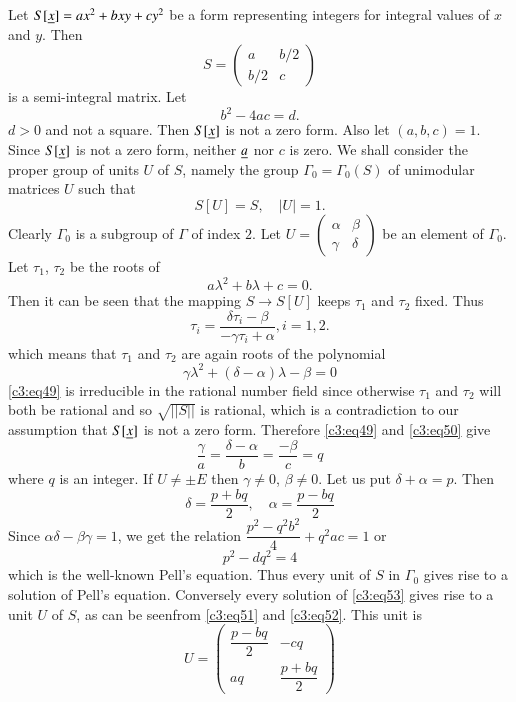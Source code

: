 Let $S[\underline{x}]=ax^{2}+bxy+cy^{2}$ be a form representing integers for
integral values of $x$ and $y$. Then
$$
S=
\begin{pmatrix}
a & b/2\\
b/2 & c
\end{pmatrix}
$$
is a semi-integral matrix. Let
$$
b^{2}-4ac=d.
$$
$d>0$ and not a square. Then $S[\underline{x}]$ is not a zero form. Also let
$(a,b,c)=1$. Since $S[\underline{x}]$ is not a zero form, neither $\underline{a}$
nor $c$ is zero. We shall consider the proper group of units $U$ of
$S$, namely the group $\Gamma_{0}=\Gamma_{0}(S)$ of unimodular
matrices $U$ such that
\begin{equation*}
S[U]=S,\quad |U|=1.\tag{48}\label{c3:eq48}
\end{equation*}
Clearly $\Gamma_{0}$ is a subgroup of $\Gamma$ of index $2$. Let
$U=\left(\begin{smallmatrix} \alpha & \beta\\ \gamma & \delta
\end{smallmatrix}\right)$ be an element of $\Gamma_{0}$. Let
$\tau_{1}$, $\tau_{2}$ be the roots of 
\begin{equation*}
a\lambda^{2}+b\lambda+c=0.\tag{49}\label{c3:eq49}
\end{equation*}\pageoriginale
Then it can be seen that the mapping $S\to S[U]$ keeps $\tau_{1}$ and
$\tau_{2}$ fixed. Thus
$$
\tau_{i}=\frac{\delta\tau_{i}-\beta}{-\gamma\tau_{i}+\alpha},i=1,2.
$$
which means that $\tau_{1}$ and $\tau_{2}$ are again roots of the
polynomial
\begin{equation*}
\gamma\lambda^{2}+(\delta-\alpha)\lambda-\beta=0\tag{50}\label{c3:eq50}
\end{equation*}
\eqref{c3:eq49} is irreducible in the rational number field since otherwise
$\tau_{1}$ and $\tau_{2}$ will both be rational and so $\sqrt{||S||}$
is rational, which is a contradiction to our assumption that
$S[\underline{x}]$ is not a zero form. Therefore \eqref{c3:eq49} and \eqref{c3:eq50}
give
\begin{equation*}
\frac{\gamma}{a}=\frac{\delta-\alpha}{b}=\frac{-\beta}{c}=q\tag{51}\label{c3:eq51}
\end{equation*}
where $q$ is an integer. If $U\neq \pm E$ then $\gamma\neq 0$,
$\beta\neq 0$. Let us put $\delta+\alpha=p$. Then
\begin{equation*}
\delta=\frac{p+bq}{2},\quad \alpha=\frac{p-bq}{2}\tag{52}\label{c3:eq52}
\end{equation*}
Since $\alpha\delta-\beta\gamma=1$, we get the relation
$\dfrac{p^{2}-q^{2}b^{2}}{4}+q^{2}ac=1$ or
\begin{equation*}
\boxed{p^{2}-dq^{2}=4}\tag{53}\label{c3:eq53}
\end{equation*}
which is the well-known Pell's equation. Thus every unit of $S$ in
$\Gamma_{0}$ gives rise to a solution of Pell's equation. Conversely
every solution of \eqref{c3:eq53} gives rise to a unit $U$ of $S$, as can
be seen\pageoriginale from \eqref{c3:eq51} and \eqref{c3:eq52}. This unit is
$$
U=
\begin{pmatrix}
\dfrac{p-bq}{2} & -cq\\[10pt]
aq & \dfrac{p+bq}{2}
\end{pmatrix}
$$

